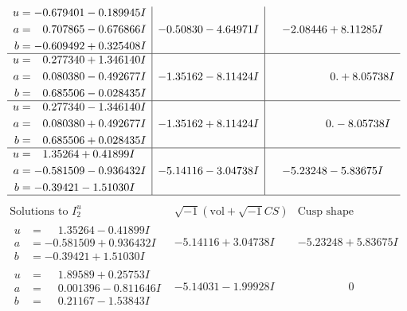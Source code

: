 \documentclass[1p]{elsarticle_modified}
\theoremstyle{definition}
\newcommand{\I}{\sqrt{-1}}
\begin{document}
$$\begin{array}{c|c|c}
\begin{aligned}
u &= -0.679401 - 0.189945 I \\
a &= \phantom{-}0.707865 - 0.676866 I \\
b &= -0.609492 + 0.325408 I\end{aligned}
 & -0.50830 - 4.64971 I & -2.08446 + 8.11285 I \\ \hline\begin{aligned}
u &= \phantom{-}0.277340 + 1.346140 I \\
a &= \phantom{-}0.080380 - 0.492677 I \\
b &= \phantom{-}0.685506 - 0.028435 I\end{aligned}
 & -1.35162 - 8.11424 I & \phantom{-0.000000 -}0. + 8.05738 I \\ \hline\begin{aligned}
u &= \phantom{-}0.277340 - 1.346140 I \\
a &= \phantom{-}0.080380 + 0.492677 I \\
b &= \phantom{-}0.685506 + 0.028435 I\end{aligned}
 & -1.35162 + 8.11424 I & \phantom{-0.000000 } 0. - 8.05738 I \\ \hline\begin{aligned}
u &= \phantom{-}1.35264 + 0.41899 I \\
a &= -0.581509 - 0.936432 I \\
b &= -0.39421 - 1.51030 I\end{aligned}
 & -5.14116 - 3.04738 I & -5.23248 - 5.83675 I\\
 \hline 
 \end{array}$$\newpage$$\begin{array}{c|c|c}  
\text{Solutions to }I^u_{2}& \I (\text{vol} + \sqrt{-1}CS) & \text{Cusp shape}\\
 \hline 
\begin{aligned}
u &= \phantom{-}1.35264 - 0.41899 I \\
a &= -0.581509 + 0.936432 I \\
b &= -0.39421 + 1.51030 I\end{aligned}
 & -5.14116 + 3.04738 I & -5.23248 + 5.83675 I \\ \hline\begin{aligned}
u &= \phantom{-}1.89589 + 0.25753 I \\
a &= \phantom{-}0.001396 - 0.811646 I \\
b &= \phantom{-}0.21167 - 1.53843 I\end{aligned}
 & -5.14031 - 1.99928 I & \phantom{-0.000000 } 0 \\ \hline\begin{aligned}

\end{aligned}
\end{array}$$
\end{document}
